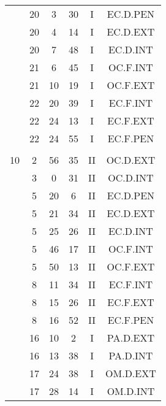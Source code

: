 \documentclass[12pt, a4paper]{article}
\begin{document}
\begin{multicols}{3}
{\begin{tabular}{c c c c c c}
	 	 	 	 & 20 & 3 & 30 & I & EC.D.PEN\\%
	 	 	 	 & 20 & 4 & 14 & I & EC.D.EXT\\%
	 	 	 	 & 20 & 7 & 48 & I & EC.D.INT\\%
	 	 	 	 & 21 & 6 & 45 & I & OC.F.INT\\%
	 	 	 	 & 21 & 10 & 19 & I & OC.F.EXT\\%
	 	 	 	 & 22 & 20 & 39 & I & EC.F.INT\\%
	 	 	 	 & 22 & 24 & 13 & I & EC.F.EXT\\%
	 	 	 	 & 22 & 24 & 55 & I & EC.F.PEN\\%
	 	 	 	 & & & & & \\%
	 	 	 	10 & 2 & 56 & 35 & II & OC.D.EXT\\%
	 	 	 	 & 3 & 0 & 31 & II & OC.D.INT\\%
	 	 	 	 & 5 & 20 & 6 & II & EC.D.PEN\\%
	 	 	 	 & 5 & 21 & 34 & II & EC.D.EXT\\%
	 	 	 	 & 5 & 25 & 26 & II & EC.D.INT\\%
	 	 	 	 & 5 & 46 & 17 & II & OC.F.INT\\%
	 	 	 	 & 5 & 50 & 13 & II & OC.F.EXT\\%
	 	 	 	 & 8 & 11 & 34 & II & EC.F.INT\\%
	 	 	 	 & 8 & 15 & 26 & II & EC.F.EXT\\%
	 	 	 	 & 8 & 16 & 52 & II & EC.F.PEN\\%
	 	 	 	 & 16 & 10 & 2 & I & PA.D.EXT\\%
	 	 	 	 & 16 & 13 & 38 & I & PA.D.INT\\%
	 	 	 	 & 17 & 24 & 38 & I & OM.D.EXT\\%
	 	 	 	 & 17 & 28 & 14 & I & OM.D.INT\\%

\end{tabular}}
\end{multicols}
\end{document}
